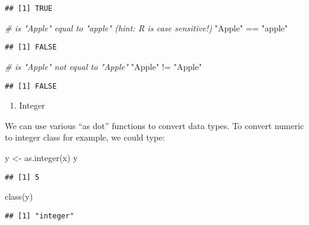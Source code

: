 \documentclass[
]{article}
\newenvironment{Shaded}{\begin{snugshade}}{\end{snugshade}}
\newcommand{\CommentTok}[1]{\textcolor[rgb]{0.56,0.35,0.01}{\textit{#1}}}
\newcommand{\FunctionTok}[1]{\textcolor[rgb]{0.00,0.00,0.00}{#1}}
\newcommand{\NormalTok}[1]{#1}
\newcommand{\OtherTok}[1]{\textcolor[rgb]{0.56,0.35,0.01}{#1}}
\newcommand{\SpecialCharTok}[1]{\textcolor[rgb]{0.00,0.00,0.00}{#1}}
\newcommand{\StringTok}[1]{\textcolor[rgb]{0.31,0.60,0.02}{#1}}
\providecommand{\tightlist}{%
  \setlength{\itemsep}{0pt}\setlength{\parskip}{0pt}}
\begin{document}
\begin{verbatim}
## [1] TRUE
\end{verbatim}

\begin{Shaded}
\begin{Highlighting}[]
\CommentTok{\# is "Apple" equal to "apple" (hint: R is case sensitive!)}
\StringTok{"Apple"} \SpecialCharTok{==} \StringTok{"apple"}
\end{Highlighting}
\end{Shaded}

\begin{verbatim}
## [1] FALSE
\end{verbatim}

\begin{Shaded}
\begin{Highlighting}[]
\CommentTok{\# is "Apple" not equal to "Apple"}
\StringTok{"Apple"} \SpecialCharTok{!=} \StringTok{"Apple"}
\end{Highlighting}
\end{Shaded}

\begin{verbatim}
## [1] FALSE
\end{verbatim}

\begin{enumerate}
\def\labelenumi{\arabic{enumi}.}
\setcounter{enumi}{3}
\tightlist
\item
  Integer
\end{enumerate}

We can use various ``as dot'' functions to convert data types. To
convert numeric to integer class for example, we could type:

\begin{Shaded}
\begin{Highlighting}[]
\NormalTok{y }\OtherTok{\textless{}{-}} \FunctionTok{as.integer}\NormalTok{(x)}
\NormalTok{y}
\end{Highlighting}
\end{Shaded}

\begin{verbatim}
## [1] 5
\end{verbatim}

\begin{Shaded}
\begin{Highlighting}[]
\FunctionTok{class}\NormalTok{(y)}
\end{Highlighting}
\end{Shaded}

\begin{verbatim}
## [1] "integer"
\end{verbatim}
\end{document}
